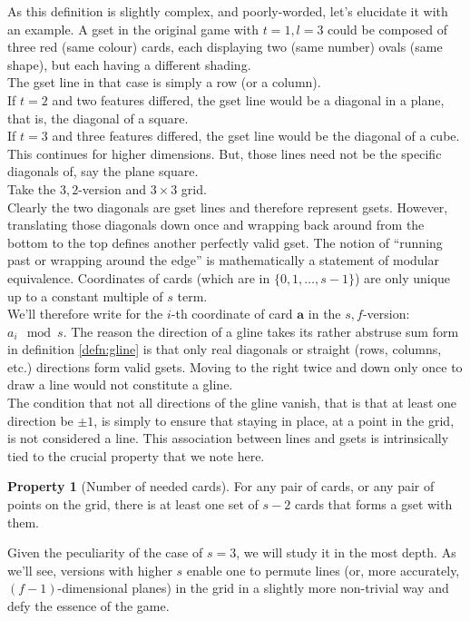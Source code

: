 \documentclass{article}
\theoremstyle{definition}
\newtheorem{prop}{Property}
\theoremstyle{remark}
\begin{document}
As this definition is slightly complex, and poorly-worded, let's elucidate it with an example.
A gset in the original game with $t=1,l=3$ could be composed of three red (same colour) cards, each displaying two (same number) ovals (same shape), but each having a different shading.\\
The gset line in that case is simply a row (or a column).\\
If $t=2$ and two features differed, the gset line would be a diagonal in a plane, that is, the diagonal of a square.\\
If $t=3$ and three features differed, the gset line would be the diagonal of a cube.\\ 
This continues for higher dimensions. 
\medbreak
But, those lines need not be the specific diagonals of, say the plane square. \\
Take the $3,2$-version and $3\times3$ grid.\\
Clearly the two diagonals are gset lines and therefore represent gsets. However, translating those diagonals down once and wrapping back around from the bottom to the top defines another perfectly valid gset.
\smallbreak
The notion of ``running past or wrapping around the edge'' is mathematically a statement of modular equivalence. Coordinates of cards (which are in $\{0,1,\dots,s-1\}$) are only unique up to a constant multiple of $s$ term.\\
We'll therefore write for the $i$-th coordinate of card $\mathbf{a}$ in the $s,f$-version: $a_i\mod s$.
\medbreak
The reason the direction of a gline takes its rather abstruse sum form in definition \ref{defn:gline} is that only real diagonals or straight (rows, columns, etc.) directions form valid gsets. Moving to the right twice and down only once to draw a line would not constitute a gline.\\
The condition that not all directions of the gline vanish, that is that at least one direction be $\pm1$, is simply to ensure that staying in place, at a point in the grid, is not considered a line.
\medbreak
This association between lines and gsets is intrinsically tied to the crucial property that we note here.
\begin{prop}[Number of needed cards]\label{prop:need_cards}
For any pair of cards, or any pair of points on the grid, there is at least one set of $s-2$ cards that forms a gset with them.
\end{prop}
Given the peculiarity of the case of $s=3$, we will study it in the most depth. As we'll see, versions with higher $s$ enable one to permute lines (or, more accurately, $(f-1)$-dimensional planes) in the grid in a slightly more non-trivial way and defy the essence of the game.\\
\end{document}
